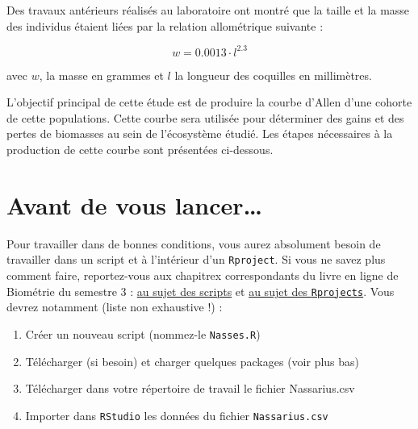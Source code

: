 \documentclass[
  a4paper,
  DIV=11,
  numbers=noendperiod,
  oneside]{scrreprt}
\providecommand{\tightlist}{%
  \setlength{\itemsep}{0pt}\setlength{\parskip}{0pt}}\usepackage{longtable,booktabs,array}
\begin{document}
Des travaux antérieurs réalisés au laboratoire ont montré que la taille
et la masse des individus étaient liées par la relation allométrique
suivante :

\[w = 0.0013 \cdot l^{2.3}\]

avec \(w\), la masse en grammes et \(l\) la longueur des coquilles en
millimètres.

\begin{tcolorbox}[enhanced jigsaw, colbacktitle=quarto-callout-important-color!10!white, opacityback=0, titlerule=0mm, leftrule=.75mm, bottomtitle=1mm, colframe=quarto-callout-important-color-frame, title=\textcolor{quarto-callout-important-color}{\faExclamation}\hspace{0.5em}{Objectif principal}, bottomrule=.15mm, opacitybacktitle=0.6, colback=white, rightrule=.15mm, breakable, toptitle=1mm, arc=.35mm, toprule=.15mm, left=2mm, coltitle=black]
L'objectif principal de cette étude est de produire la courbe d'Allen
d'une cohorte de cette populations. Cette courbe sera utilisée pour
déterminer des gains et des pertes de biomasses au sein de l'écosystème
étudié. Les étapes nécessaires à la production de cette courbe sont
présentées ci-dessous.
\end{tcolorbox}

\hypertarget{avant-de-vous-lancer}{%
\section{Avant de vous lancer\ldots{}}\label{avant-de-vous-lancer}}

Pour travailler dans de bonnes conditions, vous aurez absolument besoin
de travailler dans un script et à l'intérieur d'un \texttt{Rproject}. Si
vous ne savez plus comment faire, reportez-vous aux chapitrex
correspondants du livre en ligne de Biométrie du semestre 3 :
\href{https://besibo.github.io/BiometrieS3/01-R-basics.html\#sec-script}{au
sujet des scripts} et
\href{https://besibo.github.io/BiometrieS3/01-R-basics.html\#les-projets-ou-rprojects}{au
sujet des \texttt{Rprojects}}. Vous devrez notamment (liste non
exhaustive !) :

\begin{enumerate}
\def\labelenumi{\arabic{enumi}.}
\tightlist
\item
  Créer un nouveau script (nommez-le \texttt{Nasses.R})
\item
  Télécharger (si besoin) et charger quelques packages (voir plus bas)
\item
  Télécharger dans votre répertoire de travail le fichier Nassarius.csv
\item
  Importer dans \texttt{RStudio} les données du fichier
  \texttt{Nassarius.csv}
\end{enumerate}
\end{document}
